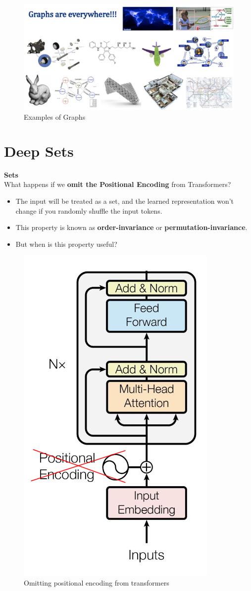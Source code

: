 \begin{figure}[h!t]
    \centering
    \includegraphics[width=0.75\linewidth]{examplesofgraphs.png}
    \caption{Examples of Graphs}
    \label{fig:enter-label}
\end{figure}

\newpage

\section{Deep Sets}

\noindent
\textbf{Sets}\\
What happens if we \textbf{omit the Positional Encoding} from Transformers?
\begin{itemize}
    \item The input will be treated as a set, and the learned representation won't change if you randomly shuffle the input tokens.
    \item This property is known as \textbf{order-invariance} or \textbf{permutation-invariance}.
    \item But when is this property useful?
\end{itemize}

\begin{figure}[h!t]
    \centering
    \includegraphics[width=0.25\linewidth]{omitposenc.png}
    \caption{Omitting positional encoding from transformers}
    \label{fig:enter-label}
\end{figure}

